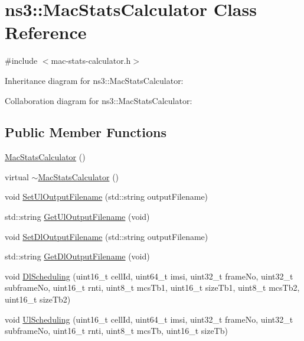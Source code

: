 \hypertarget{classns3_1_1MacStatsCalculator}{}\section{ns3\+:\+:Mac\+Stats\+Calculator Class Reference}
\label{classns3_1_1MacStatsCalculator}


{\ttfamily \#include $<$mac-\/stats-\/calculator.\+h$>$}



Inheritance diagram for ns3\+:\+:Mac\+Stats\+Calculator\+:


Collaboration diagram for ns3\+:\+:Mac\+Stats\+Calculator\+:
\subsection*{Public Member Functions}
\begin{DoxyCompactItemize}
\item 
\hyperlink{classns3_1_1MacStatsCalculator_acee2e1640d011068c88bafa7ca675611}{Mac\+Stats\+Calculator} ()
\item 
virtual \hyperlink{classns3_1_1MacStatsCalculator_ac0e2886748904d4718f546bef5ed80e4}{$\sim$\+Mac\+Stats\+Calculator} ()
\item 
void \hyperlink{classns3_1_1MacStatsCalculator_ad628644433f0da784dd1307946feebc8}{Set\+Ul\+Output\+Filename} (std\+::string output\+Filename)
\item 
std\+::string \hyperlink{classns3_1_1MacStatsCalculator_abb13fbefe40f66fb22137401a931c520}{Get\+Ul\+Output\+Filename} (void)
\item 
void \hyperlink{classns3_1_1MacStatsCalculator_a645ec89ad8601f1deaa93e9c20fdeb2a}{Set\+Dl\+Output\+Filename} (std\+::string output\+Filename)
\item 
std\+::string \hyperlink{classns3_1_1MacStatsCalculator_a2034e7b21fcc1343f62b2affbbfa0334}{Get\+Dl\+Output\+Filename} (void)
\item 
void \hyperlink{classns3_1_1MacStatsCalculator_acfbe2e6288517a685fee4b4bd708ebf6}{Dl\+Scheduling} (uint16\+\_\+t cell\+Id, uint64\+\_\+t imsi, uint32\+\_\+t frame\+No, uint32\+\_\+t subframe\+No, uint16\+\_\+t rnti, uint8\+\_\+t mcs\+Tb1, uint16\+\_\+t size\+Tb1, uint8\+\_\+t mcs\+Tb2, uint16\+\_\+t size\+Tb2)
\item 
void \hyperlink{classns3_1_1MacStatsCalculator_a1dff14e446fbebfb126948c90db9ddda}{Ul\+Scheduling} (uint16\+\_\+t cell\+Id, uint64\+\_\+t imsi, uint32\+\_\+t frame\+No, uint32\+\_\+t subframe\+No, uint16\+\_\+t rnti, uint8\+\_\+t mcs\+Tb, uint16\+\_\+t size\+Tb)
\end{DoxyCompactItemize}
